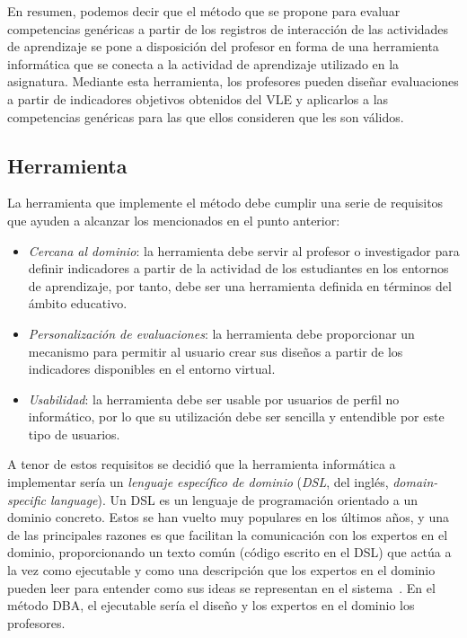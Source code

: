 En resumen, podemos decir que el método que se propone para evaluar competencias genéricas a partir de los registros de interacción de las actividades de aprendizaje se pone a disposición del profesor en forma de una herramienta informática que se conecta a la actividad de aprendizaje utilizado en la asignatura. Mediante esta herramienta, los profesores pueden diseñar evaluaciones a partir de indicadores objetivos obtenidos del VLE y aplicarlos a las competencias genéricas para las que ellos consideren que les son válidos.

\subsection{Herramienta}

La herramienta que implemente el método debe cumplir una serie de requisitos que ayuden a alcanzar los mencionados en el punto anterior:

\begin{itemize}
\item \emph{Cercana al dominio}: la herramienta debe servir al profesor o investigador para definir indicadores a partir de la actividad de los estudiantes en los entornos de aprendizaje, por tanto, debe ser una herramienta definida en términos del ámbito educativo.
\item \emph{Personalización de evaluaciones}: la herramienta debe proporcionar un mecanismo para permitir al usuario crear sus diseños a partir de los indicadores disponibles en el entorno virtual.
\item \emph{Usabilidad}: la herramienta debe ser usable por usuarios de perfil no informático, por lo que su utilización debe ser sencilla y entendible por este tipo de usuarios.
\end{itemize}

A tenor de estos requisitos se decidió que la herramienta informática a implementar sería un \emph{lenguaje específico de dominio} (\emph{DSL}, del inglés, \emph{domain-specific language}). Un DSL es un lenguaje de programación orientado a un dominio concreto. Estos se han vuelto muy populares en los últimos años, y una de las principales razones es que facilitan la comunicación con los expertos en el dominio, proporcionando un texto común (código escrito en el DSL) que actúa a la vez como ejecutable y como una descripción que los expertos en el dominio pueden leer para entender como sus ideas se representan en el sistema~\cite{fowler2010domain}. En el método DBA, el ejecutable sería el diseño y los expertos en el dominio los profesores.



